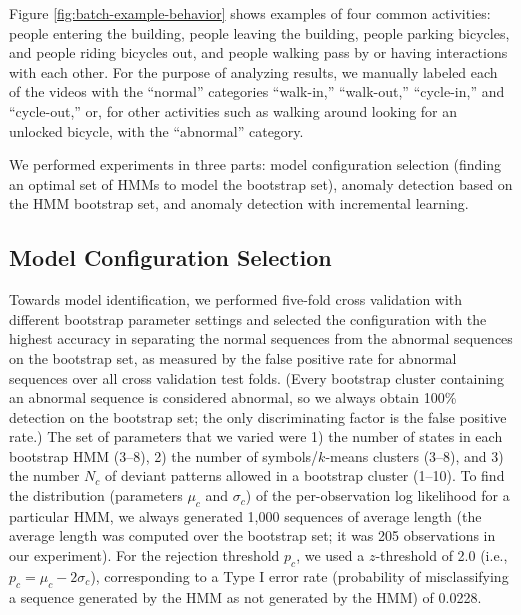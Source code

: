 Figure \ref{fig:batch-example-behavior} shows examples of four common
activities: people entering the building, people leaving the building,
people parking bicycles, and people riding bicycles out, and people walking
pass by or having interactions with each other. 
For the purpose of analyzing results, we manually labeled each of the videos
with the ``normal'' categories ``walk-in,'' ``walk-out,''
``cycle-in,'' and ``cycle-out,'' or, for other activities such as
walking around looking for an unlocked bicycle, with the ``abnormal''
category.


We performed experiments in three parts: model configuration selection
(finding an optimal set of HMMs to model the bootstrap set), anomaly
detection based on the HMM bootstrap set, and anomaly detection with
incremental learning.

\subsection{Model Configuration Selection}
\label{incremental-model-selection}

Towards model identification, we performed five-fold cross validation
with different bootstrap parameter settings and selected the
configuration with the highest accuracy in separating the normal
sequences from the abnormal sequences on the bootstrap set, as
measured by the false positive rate for abnormal sequences over all
cross validation test folds. (Every bootstrap cluster containing an
abnormal sequence is considered abnormal, so we always obtain 100\%
detection on the bootstrap set; the only discriminating factor is the
false positive rate.) The set of parameters that we varied were 1) the
number of states in each bootstrap HMM (3--8), 2) the number of
symbols/$k$-means clusters (3--8), and 3) the number $N_c$ of deviant
patterns allowed in a bootstrap cluster (1--10). To find the
distribution (parameters $\mu_c$ and $\sigma_c$) of the
per-observation log likelihood for a particular HMM, we always
generated 1,000 sequences of average length (the average length was
computed over the bootstrap set; it was 205 observations in our
experiment). For the rejection threshold $p_c$, we used a
$z$-threshold of 2.0 (i.e., $p_c = \mu_c - 2\sigma_c$), corresponding
to a Type I error rate (probability of misclassifying a sequence
generated by the HMM as not generated by the HMM) of 0.0228.

